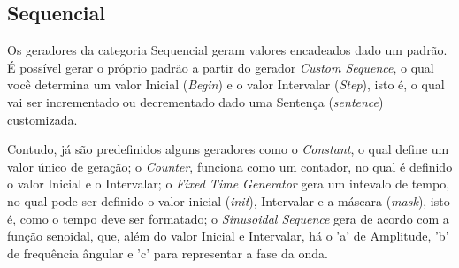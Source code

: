 \documentclass[
	12pt,				%
	openright,			%
	oneside,			%
	a4paper,			%
	english,			%
	brazil				%
	]{abntex2}
\begin{document}

		\subsection{Sequencial}
			Os geradores da categoria Sequencial geram valores encadeados dado um padrão.
			É possível gerar o próprio padrão a partir do gerador \emph{Custom Sequence}, o qual você determina um valor Inicial (\emph{Begin}) e o valor Intervalar (\emph{Step}), isto é, o qual vai ser incrementado ou decrementado dado uma Sentença (\emph{sentence}) customizada.
			\par
			Contudo, já são predefinidos alguns geradores como 
				o \emph{Constant}, o qual define um valor único de geração;
				o \emph{Counter}, funciona como um contador, no qual é definido o valor Inicial e o Intervalar;
				o \emph{Fixed Time Generator} gera um intevalo de tempo, no qual pode ser definido o valor inicial (\emph{init}), Intervalar e a máscara (\emph{mask}), isto é, como o tempo deve ser formatado;
				o \emph{Sinusoidal Sequence} gera de acordo com a função senoidal, que, além do valor Inicial e Intervalar, há o 'a' de Amplitude, 'b' de frequência ângular e 'c' para representar a fase da onda.
\end{document}
